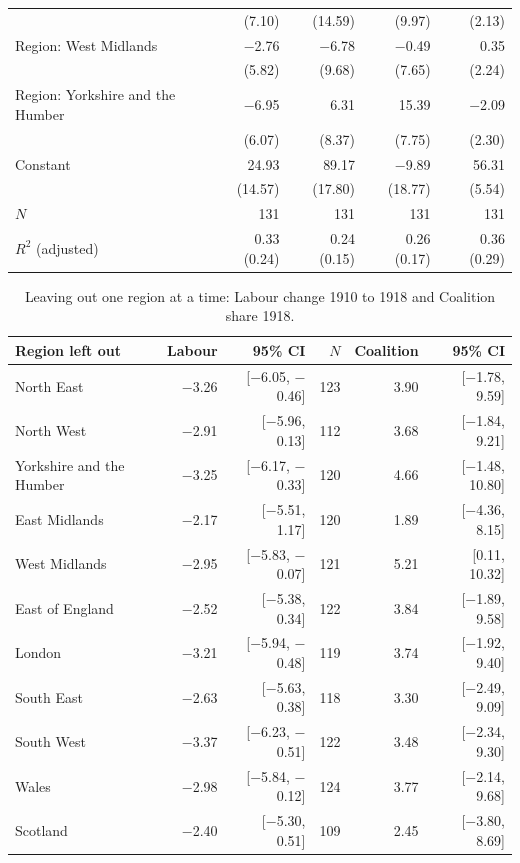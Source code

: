 \documentclass[11pt,a4paper]{article}
\begin{document}
\begin{table}[tbp]
\begin{tabular}{lrrrr}
 & (7.10) & (14.59) & (9.97) & (2.13)\\
Region: West Midlands & $-$2.76 & $-$6.78 & $-$0.49 & 0.35\\
 & (5.82) & (9.68) & (7.65) & (2.24)\\
Region: Yorkshire and the Humber & $-$6.95 & 6.31 & 15.39 & $-$2.09\\
 & (6.07) & (8.37) & (7.75) & (2.30)\\
Constant & 24.93 & 89.17 & $-$9.89 & 56.31\\
 & (14.57) & (17.80) & (18.77) & (5.54)\\
\midrule $N$ & 131 & 131 & 131 & 131\\
$R^2$ (adjusted) & 0.33 (0.24) & 0.24 (0.15) & 0.26 (0.17) & 0.36 (0.29)\\
\bottomrule\end{tabular}\end{table}

\begin{table}[tbp]\centering\footnotesize\caption{Leaving out one region at a time: Labour change 1910 to 1918 and Coalition share 1918.}\label{tab:loro}\begin{tabular}{lrrrrr}\toprule Region left out & Labour & 95\% CI & $N$ & Coalition & 95\% CI\\\midrule
North East & $-$3.26 & [$-$6.05, $-$0.46] & 123 & 3.90 & [$-$1.78, 9.59]\\
North West & $-$2.91 & [$-$5.96, 0.13] & 112 & 3.68 & [$-$1.84, 9.21]\\
Yorkshire and the Humber & $-$3.25 & [$-$6.17, $-$0.33] & 120 & 4.66 & [$-$1.48, 10.80]\\
East Midlands & $-$2.17 & [$-$5.51, 1.17] & 120 & 1.89 & [$-$4.36, 8.15]\\
West Midlands & $-$2.95 & [$-$5.83, $-$0.07] & 121 & 5.21 & [0.11, 10.32]\\
East of England & $-$2.52 & [$-$5.38, 0.34] & 122 & 3.84 & [$-$1.89, 9.58]\\
London & $-$3.21 & [$-$5.94, $-$0.48] & 119 & 3.74 & [$-$1.92, 9.40]\\
South East & $-$2.63 & [$-$5.63, 0.38] & 118 & 3.30 & [$-$2.49, 9.09]\\
South West & $-$3.37 & [$-$6.23, $-$0.51] & 122 & 3.48 & [$-$2.34, 9.30]\\
Wales & $-$2.98 & [$-$5.84, $-$0.12] & 124 & 3.77 & [$-$2.14, 9.68]\\
Scotland & $-$2.40 & [$-$5.30, 0.51] & 109 & 2.45 & [$-$3.80, 8.69]\\
\bottomrule\end{tabular}\end{table}
\end{document}
